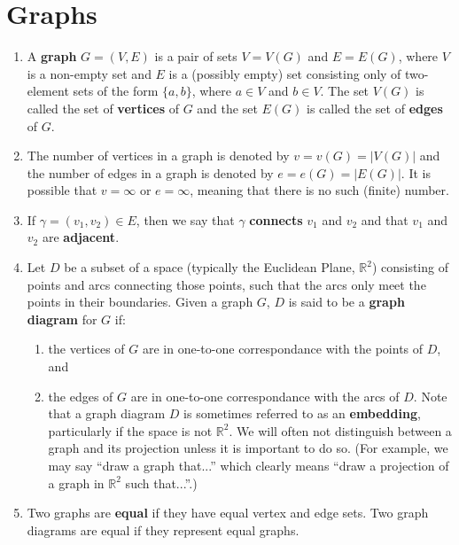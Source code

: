 \section{Graphs}\label{sec:graphs}

\begin{definition}\leavevmode
\begin{enumerate}
    \item \label{def:graph} A \textbf{graph} $G=(V, E)$ is a pair of sets $V=V(G)$ and $E=E(G)$, where $V$ is a non-empty set and $E$ is a (possibly empty) set consisting only of two-element sets of the form $\{a, b\}$, where $a \in V$ and $b \in V$.  The set $V(G)$ is called the set of \textbf{vertices} of $G$ and the set $E(G)$ is called the set of \textbf{edges} of $G$.
    \item The number of vertices in a graph is denoted by $v=v(G)=|V(G)|$ and the number of edges in a graph is denoted by $e=e(G)=|E(G)|$.  It is possible that $v=\infty$ or $e=\infty$, meaning that there is no such (finite) number.
    \item If $\gamma=(v_1, v_2)\in E$, then we say that $\gamma$ \textbf{connects} $v_1$ and $v_2$ and that $v_1$ and $v_2$ are \textbf{adjacent}.
    \item \label{def:graph_diagram} Let $D$ be a subset of a space (typically the Euclidean Plane, $\mathbb{R}^2$) consisting of points and arcs connecting those points, such that the arcs only meet the points in their boundaries.  Given a graph $G$, $D$ is said to be a \textbf{graph diagram} for $G$ if:
    \begin{enumerate}
        \item the vertices of $G$ are in one-to-one correspondance with the points of $D$, and
        \item the edges of $G$ are in one-to-one correspondance with the arcs of $D$.
    Note that a graph diagram $D$ is sometimes referred to as an \textbf{embedding}, particularly if the space is not $\mathbb{R}^2$.  We will often not distinguish between a graph and its projection unless it is important to do so. (For example, we may say ``draw a graph that...'' which clearly means ``draw a projection of a graph in $\mathbb{R}^2$ such that...''.)
    \end{enumerate}

    \item Two graphs are \textbf{equal} if they have equal vertex and edge sets.  Two graph diagrams are equal if they represent equal graphs.
\end{enumerate}
\end{definition}

